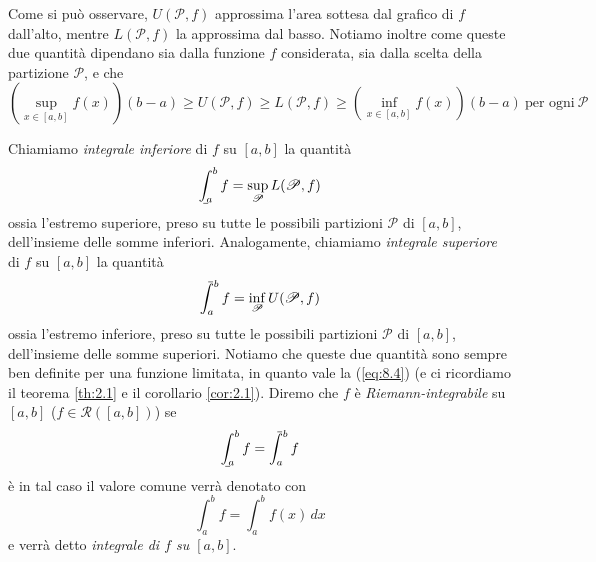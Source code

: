 \begin{remark}
\begin{center}
\begin{minipage}{.45\linewidth}
    \end{minipage}
\end{center}
Come si può osservare, $U(\mathscr{P}, f)$ approssima l'area sottesa dal grafico di $f$ dall'alto, mentre $L(\mathscr{P}, f)$ la approssima dal basso. Notiamo inoltre come queste due quantità dipendano sia dalla funzione $f$ considerata, sia dalla scelta della partizione $\mathscr{P}$, e che
\begin{equation}
    \label{eq:8.4}
    \left(\sup_{x\in[a,b]}f(x)\right)(b-a)\ge U(\mathscr{P}, f) \ge L(\mathscr{P},f) \ge \left(\inf_{x\in[a,b]}f(x)\right)(b-a) \ \text{per ogni} \ \mathscr{P}
\end{equation}
\end{remark}
\begin{definition}
    \label{def:8.2}
    Chiamiamo \emph{integrale inferiore} di $f$ su $[a,b]$ la quantità
    \[
    \bint_a^b f = \sup_{\mathscr{P}} L(\mathscr{P},f)
    \]
    ossia l'estremo superiore, preso su tutte le possibili partizioni $\mathscr{P}$ di $[a,b]$, dell'insieme delle somme inferiori. Analogamente, chiamiamo \emph{integrale superiore} di $f$ su $[a,b]$ la quantità
    \[
    \aint_a^b f = \inf_{\mathscr{P}} U(\mathscr{P},f)
    \]
    ossia l'estremo inferiore, preso su tutte le possibili partizioni $\mathscr{P}$ di $[a,b]$, dell'insieme delle somme superiori. Notiamo che queste due quantità sono sempre ben definite per una funzione limitata, in quanto vale la (\ref{eq:8.4}) (e ci ricordiamo il teorema \ref{th:2.1} e il corollario \ref{cor:2.1}). Diremo che $f$ è \emph{Riemann-integrabile} su $[a,b]$ ($f\in\mathscr{R}([a,b])$) se
    \[
    \bint_a^b f = \aint_a^b f
    \]
    è in tal caso il valore comune verrà denotato con
    \[
    \int_a^b f = \int_a^b f(x)\, dx 
    \]
    e verrà detto \emph{integrale di $f$ su $[a,b]$}.
\end{definition}
